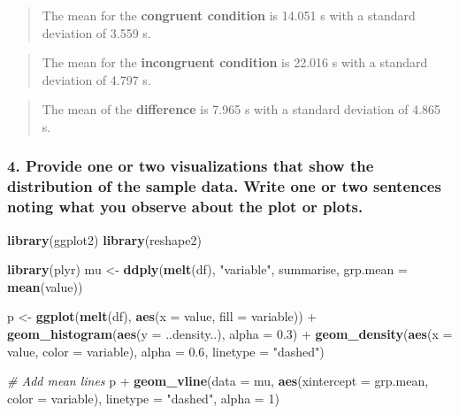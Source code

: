 \documentclass[]{article}
\newenvironment{Shaded}{\begin{snugshade}}{\end{snugshade}}
\newcommand{\KeywordTok}[1]{\textcolor[rgb]{0.13,0.29,0.53}{\textbf{{#1}}}}
\newcommand{\DataTypeTok}[1]{\textcolor[rgb]{0.13,0.29,0.53}{{#1}}}
\newcommand{\DecValTok}[1]{\textcolor[rgb]{0.00,0.00,0.81}{{#1}}}
\newcommand{\FloatTok}[1]{\textcolor[rgb]{0.00,0.00,0.81}{{#1}}}
\newcommand{\StringTok}[1]{\textcolor[rgb]{0.31,0.60,0.02}{{#1}}}
\newcommand{\CommentTok}[1]{\textcolor[rgb]{0.56,0.35,0.01}{\textit{{#1}}}}
\newcommand{\NormalTok}[1]{{#1}}
\begin{document}
\begin{quote}
The mean for the \textbf{congruent condition} is 14.051 s with a
standard deviation of 3.559 s.
\end{quote}

\begin{quote}
The mean for the \textbf{incongruent condition} is 22.016 s with a
standard deviation of 4.797 s.
\end{quote}

\begin{quote}
The mean of the \textbf{difference} is 7.965 s with a standard deviation
of 4.865 s.
\end{quote}

\subsubsection{4. Provide one or two visualizations that show the
distribution of the sample data. Write one or two sentences noting what
you observe about the plot or
plots.}\label{provide-one-or-two-visualizations-that-show-the-distribution-of-the-sample-data.-write-one-or-two-sentences-noting-what-you-observe-about-the-plot-or-plots.}

\begin{Shaded}
\begin{Highlighting}[]
\KeywordTok{library}\NormalTok{(ggplot2)}
\KeywordTok{library}\NormalTok{(reshape2)}

\KeywordTok{library}\NormalTok{(plyr)}
\NormalTok{mu <-}\StringTok{ }\KeywordTok{ddply}\NormalTok{(}\KeywordTok{melt}\NormalTok{(df), }\StringTok{"variable"}\NormalTok{, summarise, }\DataTypeTok{grp.mean =} \KeywordTok{mean}\NormalTok{(value))}

\NormalTok{p <-}\StringTok{ }\KeywordTok{ggplot}\NormalTok{(}\KeywordTok{melt}\NormalTok{(df), }\KeywordTok{aes}\NormalTok{(}\DataTypeTok{x =} \NormalTok{value, }\DataTypeTok{fill =} \NormalTok{variable)) +}\StringTok{ }
\StringTok{    }\KeywordTok{geom_histogram}\NormalTok{(}\KeywordTok{aes}\NormalTok{(}\DataTypeTok{y =} \NormalTok{..density..), }\DataTypeTok{alpha =} \FloatTok{0.3}\NormalTok{) +}\StringTok{ }
\StringTok{    }\KeywordTok{geom_density}\NormalTok{(}\KeywordTok{aes}\NormalTok{(}\DataTypeTok{x =} \NormalTok{value, }\DataTypeTok{color =} \NormalTok{variable), }\DataTypeTok{alpha =} \FloatTok{0.6}\NormalTok{, }
        \DataTypeTok{linetype =} \StringTok{"dashed"}\NormalTok{)}

\CommentTok{# Add mean lines}
\NormalTok{p +}\StringTok{ }\KeywordTok{geom_vline}\NormalTok{(}\DataTypeTok{data =} \NormalTok{mu, }\KeywordTok{aes}\NormalTok{(}\DataTypeTok{xintercept =} \NormalTok{grp.mean, }\DataTypeTok{color =} \NormalTok{variable), }
    \DataTypeTok{linetype =} \StringTok{"dashed"}\NormalTok{, }\DataTypeTok{alpha =} \DecValTok{1}\NormalTok{)}
\end{Highlighting}
\end{Shaded}
\end{document}
